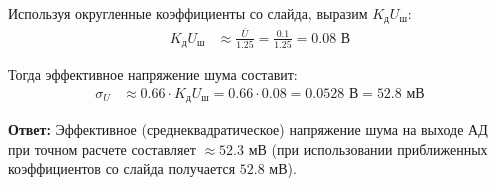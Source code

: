 Используя округленные коэффициенты со слайда, выразим $K_{\text{д}} U_{\text{ш}}$:
\begin{align*}
    K_{\text{д}} U_{\text{ш}} &\approx \frac{\bar{U}}{1.25} = \frac{0.1}{1.25} = 0.08 \text{ В}
\end{align*}

Тогда эффективное напряжение шума составит:
\begin{align*}
    \sigma_U &\approx 0.66 \cdot K_{\text{д}} U_{\text{ш}} = 0.66 \cdot 0.08 = 0.0528 \text{ В} = 52.8 \text{ мВ}
\end{align*}

\textbf{Ответ:} Эффективное (среднеквадратическое) напряжение шума на выходе АД при точном расчете составляет $\approx 52.3 \text{ мВ}$ (при использовании приближенных коэффициентов со слайда получается $52.8 \text{ мВ}$).